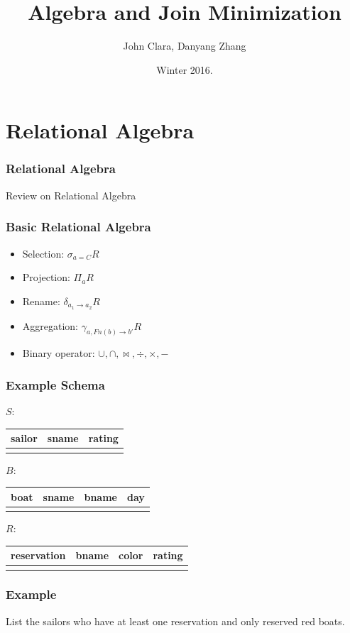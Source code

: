 \documentclass{beamer}
\begin{document}
\title{Algebra and Join Minimization}
\author{John Clara, Danyang Zhang}
\date[WI 2016]{Winter 2016.}

\subject{Algebra and Join Minimization}

\begin{frame}
  \titlepage
\end{frame}
\section{Relational Algebra}

\begin{frame}
  \frametitle{Relational Algebra}
 Review on Relational Algebra
\end{frame}

\begin{frame}
  \frametitle{Basic Relational Algebra}
  \begin{itemize}
  \item Selection: $\sigma_{a=C} R$
  \item Projection: $\Pi_{a}R$
  \item Rename: $\delta_{a_1 \rightarrow a_2}R$
  \item Aggregation: $\gamma_{a, Fn(b)\rightarrow b'}R$
  \item Binary operator: $\cup, \cap, \bowtie, \div, \times, -$
  \end{itemize}
\end{frame}
\begin{frame}
\frametitle{Example Schema}
$S: $
\begin{tabular}{c|cc}
  sailor & sname & rating \\
  \hline
  \\
\end{tabular}

$B: $
\begin{tabular}{c|ccc}
  boat & sname & bname & day\\
  \hline
  \\
\end{tabular}

$R:$
\begin{tabular}{c|ccc}
  reservation & bname  & color & rating \\
  \hline
  \\
\end{tabular}
\end{frame}
\begin{frame}
\frametitle{Example}
List the sailors who have at least one reservation and only reserved red boats.  
\end{frame}
\end{document}
